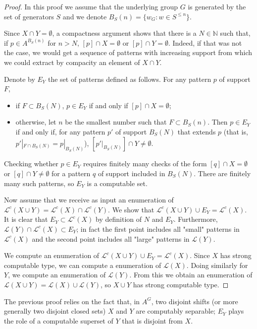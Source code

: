 \documentclass[french,american]{article}
\theoremstyle{plain}
\theoremstyle{definition}
\theoremstyle{remark}
\theoremstyle{plain}
\newcommand{\N}{\mathbb{N}}
\renewcommand{\L}{\mathcal L}
\begin{document}
\begin{proof}
In this proof we assume that the underlying group $G$ is generated by the set of generators $S$ and we denote $B_S(n)=\{w_G : w\in S^{\leq n}\}$.

Since $X\cap Y = \emptyset$, a compactness argument shows that there is a $N\in \N$ such that, if $p \in A^{B_S(n)}$ for $n>N$,  $[p]\cap X = \emptyset$ or $[p]\cap Y = \emptyset$. Indeed, if that was not the case, we would get a sequence of patterns with increasing support from which we could extract by compacity an element of $X\cap Y$.

Denote by $E_Y$ the set of patterns defined as follows. For any pattern $p$ of support $F$,
\begin{itemize}
\item if $F \subset B_S(N)$, $p\in E_Y$ if and only if $[p]\cap X = \emptyset$;
\item otherwise, let $n$ be the smallest number such that $F \subset B_S(n)$. Then $p\in E_Y$ if and only if, for any pattern $p'$ of support $B_S(N)$ that extends $p$ (that is, $p'|_{F\cap B_S(N)}=p|_{B_S(N)}$), $[p'|_{B_S(N)}]\cap Y\neq \emptyset$.
\end{itemize}

Checking whether $p\in E_Y$ requires finitely many checks of the form $[q]\cap X = \emptyset$ or $[q]\cap Y \neq \emptyset$ for a pattern $q$ of support included in $B_S(N)$. There are finitely many such patterns, so $E_Y$ is a computable set.

Now assume that we receive as input an enumeration of $\L^c(X\cup Y) = \L^c(X)\cap \L^c(Y)$. We show that $\L^c(X\cup Y) \cup E_Y = \L^c(X)$. It is clear that $E_Y\subset\L^c(X)$ by definition of $N$ and $E_Y$. Furthermore, $\L(Y)\cap \L^c(X) \subset E_Y$; in fact the first point  includes all "small" patterns in $\L^c(X)$ and the second point includes all "large" patterns in $\L(Y)$.

 We compute an enumeration of $\L^c(X\cup Y) \cup E_Y = \L^c(X)$. Since $X$ has strong computable type, we can compute a enumeration of $\L(X)$. Doing similarly for $Y$, we compute an enumeration of $\L(Y)$. From this we obtain an enumeration of $\L(X\cup Y) = \L(X) \cup \L(Y)$, so $X\cup Y$ has strong computable type.
\end{proof}

The previous proof relies on the fact that, in $A^G$, two disjoint shifts  (or more generally two disjoint closed sets) $X$ and $Y$ are computably separable; $E_Y$ plays the role of a computable superset of $Y$ that is disjoint from $X$.
\end{document}
